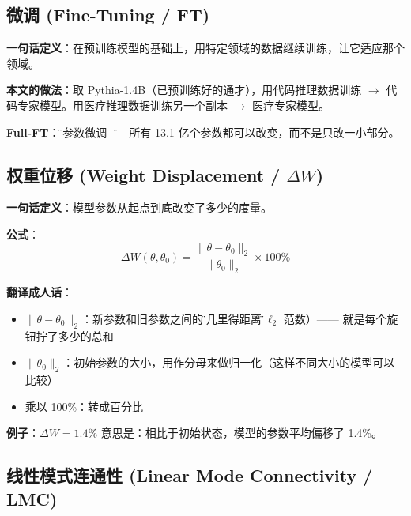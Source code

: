 \documentclass[12pt,a4paper]{article}
\begin{document}
\subsection{微调 (Fine-Tuning / FT)}

\begin{conceptbox}
\textbf{一句话定义}：在预训练模型的基础上，用特定领域的数据继续训练，让它适应那个领域。

\textbf{本文的做法}：取 Pythia-1.4B（已预训练好的通才），用代码推理数据训练 $\rightarrow$ 代码专家模型。用医疗推理数据训练另一个副本 $\rightarrow$ 医疗专家模型。

\textbf{Full-FT}：\"全参数微调\"——所有 13.1 亿个参数都可以改变，而不是只改一小部分。
\end{conceptbox}

\subsection{权重位移 (Weight Displacement / $\Delta W$)}

\begin{conceptbox}
\textbf{一句话定义}：模型参数从起点到底改变了多少的度量。

\textbf{公式}：
\[
\Delta W(\theta, \theta_0) = \frac{\|\theta - \theta_0\|_2}{\|\theta_0\|_2} \times 100\%
\]

\textbf{翻译成人话}：
\begin{itemize}
    \item $\|\theta - \theta_0\|_2$：新参数和旧参数之间的\"欧几里得距离\"（$\ell_2$ 范数）—— 就是每个旋钮拧了多少的总和
    \item $\|\theta_0\|_2$：初始参数的大小，用作分母来做归一化（这样不同大小的模型可以比较）
    \item 乘以 100\%：转成百分比
\end{itemize}

\textbf{例子}：$\Delta W = 1.4\%$ 意思是：相比于初始状态，模型的参数平均偏移了 1.4\%。
\end{conceptbox}

\subsection{线性模式连通性 (Linear Mode Connectivity / LMC)}
\end{document}
